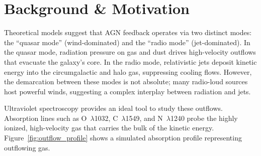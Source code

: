 \section{Background \& Motivation}
Theoretical models suggest that AGN feedback operates via two distinct modes: the ``quasar mode'' (wind-dominated) and the ``radio mode'' (jet-dominated). In the quasar mode, radiation pressure on gas and dust drives high-velocity outflows that evacuate the galaxy's core. In the radio mode, relativistic jets deposit kinetic energy into the circumgalactic and halo gas, suppressing cooling flows. However, the demarcation between these modes is not absolute; many radio-loud sources host powerful winds, suggesting a complex interplay between radiation and jets.

Ultraviolet spectroscopy provides an ideal tool to study these outflows. Absorption lines such as O\, $\lambda$1032, C\, $\lambda$1549, and N\, $\lambda$1240 probe the highly ionized, high-velocity gas that carries the bulk of the kinetic energy. Figure~\ref{fig:outflow_profile} shows a simulated absorption profile representing outflowing gas.

